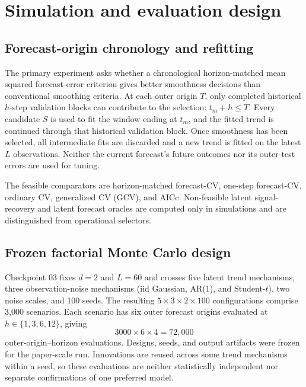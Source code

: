 \section{Simulation and evaluation design}
\label{sec:evaluation}

\subsection{Forecast-origin chronology and refitting}

The primary experiment asks whether a
chronological horizon-matched mean
squared forecast-error criterion gives
better smoothness decisions than
conventional smoothing criteria.
At each outer origin $T$, only completed
historical $h$-step validation blocks
can contribute to the selection:
$t_m+h\le T$. Every candidate $S$
is used to fit the window ending at
$t_m$, and the fitted trend is continued
through that historical validation
block. Once smoothness has been
selected, all intermediate fits are
discarded and a new trend is fitted
on the latest $L$ observations.
Neither the current forecast's future
outcomes nor its outer-test errors
are used for tuning.

The feasible comparators are
horizon-matched forecast-CV, one-step
forecast-CV, ordinary CV, generalized
CV (GCV), and AICc. Non-feasible
latent signal-recovery and latent
forecast oracles are computed only in
simulations and are distinguished
from operational selectors.

\subsection{Frozen factorial Monte Carlo design}

Checkpoint 03 fixes $d=2$ and $L=60$
and crosses five latent trend mechanisms,
three observation-noise mechanisms
(iid Gaussian, AR(1), and Student-$t$),
two noise scales, and 100 seeds.
The resulting $5\times3\times2\times100$
configurations comprise 3,000 scenarios.
Each scenario has six outer forecast origins
evaluated at $h\in\{1,3,6,12\}$, giving
\begin{equation}
\label{eq:simulation_sample_count}
3000\times6\times4=72{,}000
\end{equation}
outer-origin--horizon evaluations. Designs,
seeds, and output artifacts were frozen for
the paper-scale run. Innovations are reused
across some trend mechanisms within a seed,
so these evaluations are neither
statistically independent nor separate
confirmations of one preferred model.

